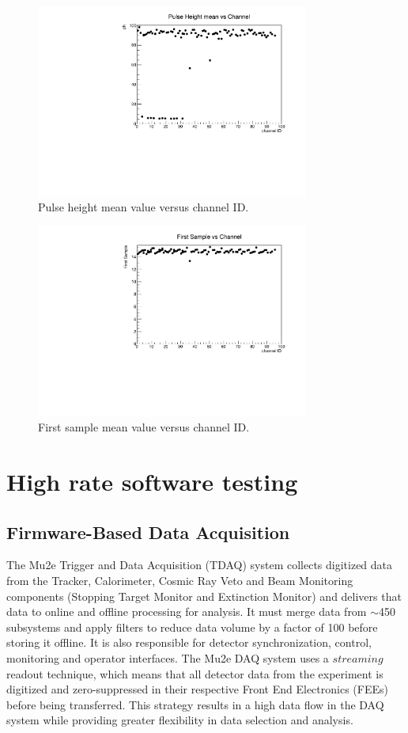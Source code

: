\begin{figure}[!h]
  \centering
  \includegraphics[width=0.8\textwidth]{figures/pdf/ph_vs_ch1.pdf}
  \caption{Pulse height mean value versus channel ID.}
  \label{fig:phvsch}
\end{figure}
\begin{figure}[!h]
  \centering
  \includegraphics[width=0.8\textwidth]{figures/pdf/fs_vs_ch1.pdf}
  \caption{First sample mean value versus channel ID.}
  \label{fig:fsvsch}
\end{figure}
\section{High rate software testing}
\subsection{Firmware-Based Data Acquisition}
The Mu2e Trigger and Data Acquisition (TDAQ) system collects digitized data from the Tracker, 
Calorimeter, Cosmic Ray Veto and Beam Monitoring components (Stopping Target Monitor and Extinction Monitor) 
and delivers that data to online and offline processing for analysis. It must merge data from $\sim$450 subsystems 
and apply filters to reduce data volume by a factor of 100 before storing it offline. It is also responsible for 
detector synchronization, control, monitoring and operator interfaces. The Mu2e DAQ system uses a $streaming$ readout technique, 
which means that all detector data from the experiment is digitized and zero-suppressed in their respective Front End Electronics 
(FEEs) before being transferred. This strategy results in a high data flow in the DAQ system while providing greater flexibility in data selection and analysis.
